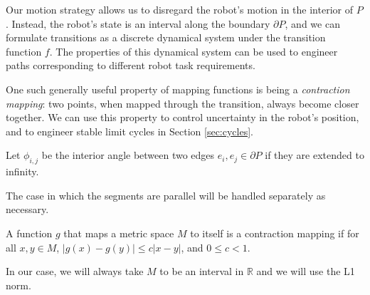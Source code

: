 \documentclass[]{styles/svproc}  %
\begin{document}

Our motion strategy allows us to disregard the robot's motion in the interior of
$P$. Instead, the robot's state is an interval 
along the boundary $\partial P$, and we can formulate transitions as a discrete
dynamical system under the transition function $f$. The properties of this
dynamical system can be used to engineer paths corresponding to different robot
task requirements.

One such generally useful property of mapping functions is being a \emph{contraction mapping}: 
two points, when mapped through the
transition, always become closer together. We can use this property to control
uncertainty in the robot's position, and to engineer stable limit cycles in
Section \ref{sec:cycles}.

\begin{definition}
Let $\phi_{i,j}$ be the interior angle between two edges $e_i, e_j \in \partial P$ if
they are extended to infinity. 
\end{definition}
The case in which the segments are parallel will be
handled separately as necessary. 

\begin{definition}

A function $g$ that maps a metric space $M$ to itself is a contraction mapping if for all
$x, y \in M$, $\lvert g(x) - g(y) \rvert \leq c \lvert x-y \rvert$, and $0 \leq c < 1$.
\end{definition}

In our case, we will always take $M$ to be an interval in $\mathbb{R}$ and we
will use the L1 norm.
\end{document}

